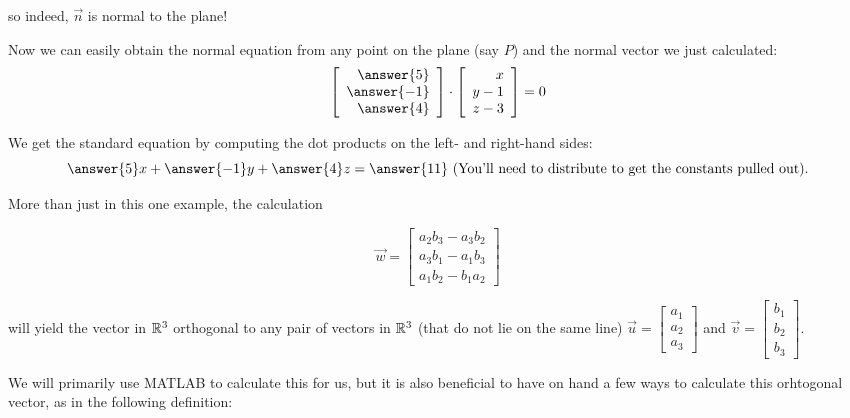 \documentclass{ximera}
\begin{document}
\begin{example}
    so indeed, $\vec{n}$ is normal to the plane!

 

    Now we can easily obtain the normal equation from any point on the
    plane (say $P$) and the normal vector we just calculated:
    \begin{equation*}
      \startmat{r}\answer{5} \\ \answer{-1} \\ \answer{4} \stopmat
      \cdot
      \startmat{r} x \\ y-1 \\ z-3 \stopmat
      =
      0
    \end{equation*}




    We get the standard equation by computing the dot products on the
    left- and right-hand sides:
    \begin{equation*}
      \answer{5}x +\answer{-1} y + \answer{4}z = \answer{11}\text{ (You'll need to distribute to get the constants pulled out)}.
    \end{equation*}

  \end{example}

  More than just in this one example, the calculation 

  
  $$\vec{w}=\begin{bmatrix}
      a_2b_3-a_3b_2\\a_3b_1-a_1b_3\\a_1b_2-b_1a_2
    \end{bmatrix}$$

  will yield the vector in $\mathbb{R}^3$ orthogonal to any pair of vectors in $\mathbb{R}^3$ (that do not lie on the same line) $\vec{u}=\begin{bmatrix}
      a_1\\a_2\\a_3
    \end{bmatrix}$ and $\vec{v}=\begin{bmatrix}
      b_1\\b_2\\b_3
    \end{bmatrix}$.

   

  We will primarily use MATLAB to calculate this for us, but it is also beneficial to have on hand a few ways to calculate this orhtogonal vector, as in the following definition:
 
\end{document}
